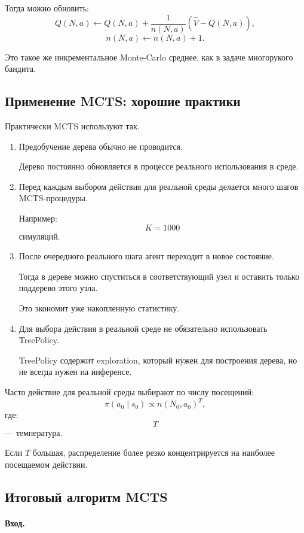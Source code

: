 \documentclass[12pt,a4paper]{article}
\begin{document}
Тогда можно обновить:
\[
Q(N,a)
\leftarrow
Q(N,a)
+
\frac{1}{n(N,a)}
\left(
\widehat V-Q(N,a)
\right),
\]
\[
n(N,a)
\leftarrow
n(N,a)+1.
\]

Это такое же инкрементальное Monte-Carlo среднее, как в задаче многорукого бандита.

\subsection{Применение MCTS: хорошие практики}

Практически MCTS используют так.

\begin{enumerate}
    \item Предобучение дерева обычно не проводится.

    Дерево постоянно обновляется в процессе реального использования в среде.

    \item Перед каждым выбором действия для реальной среды делается много шагов MCTS-процедуры.

    Например:
    \[
    K=1000
    \]
    симуляций.

    \item После очередного реального шага агент переходит в новое состояние.

    Тогда в дереве можно спуститься в соответствующий узел и оставить только поддерево этого узла.

    Это экономит уже накопленную статистику.

    \item Для выбора действия в реальной среде не обязательно использовать TreePolicy.

    TreePolicy содержит exploration, который нужен для построения дерева, но не всегда нужен на инференсе.
\end{enumerate}

Часто действие для реальной среды выбирают по числу посещений:
\[
\pi(a_0\mid s_0)
\propto
n(N_0,a_0)^T,
\]
где:
\[
T
\]
--- температура.

Если $T$ большая, распределение более резко концентрируется на наиболее посещаемом действии.

\subsection{Итоговый алгоритм MCTS}

\paragraph{Вход.}
\end{document}

